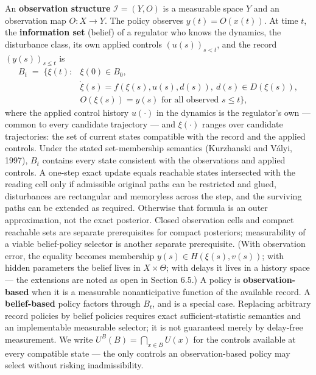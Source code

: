 \documentclass[10pt,twocolumn]{article}
\theoremstyle{definition}
\begin{document}
An \textbf{observation structure} \(\mathcal{I} = (Y, O)\) is a
measurable space \(Y\) and an observation map \(O : X \to Y\). The
policy observes \(y(t) = O(x(t))\). At time \(t\), the
\textbf{information set} (belief) of a regulator who knows the dynamics,
the disturbance class, its own applied controls \((u(s))_{s<t}\), and the record \((y(s))_{s \le t}\) is
\[
\begin{aligned}
B_t \;=\; \bigl\{ \xi(t) : {}& \xi(0) \in B_0,\\
& \dot\xi(s) = f(\xi(s), u(s), d(s)),\ d(s) \in D(\xi(s)),\\
& O(\xi(s)) = y(s) \text{ for all observed } s \le t \bigr\},
\end{aligned}
\]
where the applied control history \(u(\cdot)\) in the dynamics is
the regulator's own --- common to every candidate trajectory --- and
\(\xi(\cdot)\) ranges over candidate trajectories: the set of current
states compatible with the record and the applied controls. Under the stated set-membership semantics (Kurzhanski and V\'alyi, 1997), \(B_t\) contains every state consistent with the observations and applied controls. A one-step exact update equals reachable states intersected with the reading cell only if admissible original paths can be restricted and glued, disturbances are rectangular and memoryless across the step, and the surviving paths can be extended as required. Otherwise that formula is an outer approximation, not the exact posterior. Closed observation cells and compact reachable sets are separate prerequisites for compact posteriors; measurability of a viable belief-policy selector is another separate prerequisite. (With
observation error, the equality becomes membership
\(y(s) \in H(\xi(s), v(s))\); with hidden parameters the belief lives in
\(X \times \Theta\); with delays it lives in a history space --- the extensions are noted as open in Section 6.5.) A policy is \textbf{observation-based} when it is a measurable nonanticipative function of the available record. A \textbf{belief-based} policy factors through \(B_t\), and is a special case. Replacing arbitrary record policies by belief policies requires exact sufficient-statistic semantics and an implementable measurable selector; it is not guaranteed merely by delay-free measurement. We write \(U^B(B) = \bigcap_{x \in B} U(x)\) for the
controls available at every compatible state --- the only controls an
observation-based policy may select without risking inadmissibility.
\end{document}
